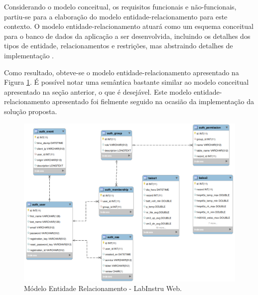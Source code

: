Considerando o modelo conceitual, os requisitos funcionais e não-funcionais, partiu-se para a elaboração do modelo entidade-relacionamento para este contexto. O modelo entidade-relacionamento atuará como um esquema conceitual para o banco de dados da aplicação a ser desenvolvida, incluindo os detalhes dos tipos de entidade, relacionamentos e restrições, mas abstraindo detalhes de implementação \cite{Navathe:Livro}.

Como resultado, obteve-se o modelo entidade-relacionamento apresentado na Figura \ref{fig:mer}. É possível notar uma semântica bastante similar ao modelo conceitual apresentado na seção anterior, o que é desejável. Este modelo entidade-relacionamento apresentado foi fielmente seguido na ocasião da implementação da solução proposta.

\begin{figure}[H]
	\centering
	\includegraphics[scale=1.0]{img/mer.png}
	\caption{Módelo Entidade Relacionamento - LabInstru Web.}
	\label{fig:mer}
\end{figure}
